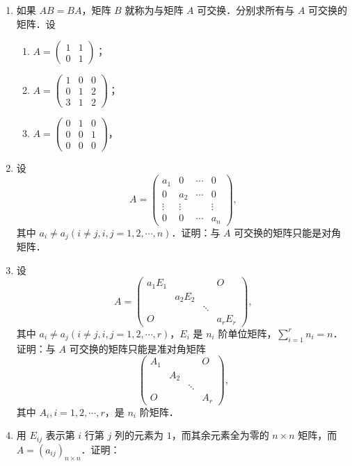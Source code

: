 \begin{enumerate}
\begin{enumerate}
  \anssub
  \end{enumerate}
  \item 如果 $AB=BA$，矩阵 $B$ 就称为与矩阵 $A$ 可交换．分别求所有与 $A$ 可交换的矩阵．设
  \begin{enumerate}
    \item $A=\begin{pmatrix}1&1\\0&1\end{pmatrix}$；
  \anssub
    \item $A=\begin{pmatrix}1&0&0\\0&1&2\\3&1&2\end{pmatrix}$；
  \anssub
    \item $A=\begin{pmatrix}0&1&0\\0&0&1\\0&0&0\end{pmatrix}$，
  \anssub
  \end{enumerate}
  \item 设
  \[
    A=\begin{pmatrix}
      a_1&0&\cdots&0\\
      0&a_2&\cdots&0\\
      \vdots&\vdots&&\vdots\\
      0&0&\cdots&a_n
    \end{pmatrix},
  \]
  其中 $a_i\neq a_j(i\neq j,i,j=1,2,\cdots,n)$．证明：与 $A$ 可交换的矩阵只能是对角矩阵．
  \ansproof
  \item 设
  \[
    A=\begin{pmatrix}
      a_1E_1&&&O\\
      &a_2E_2&&\\
      &&\ddots&\\
      O&&&a_rE_r
    \end{pmatrix},
  \]
  其中 $a_i\neq a_j(i\neq j,i,j=1,2,\cdots,r)$，$E_i$ 是 $n_i$ 阶单位矩阵，$\sum\limits_{i=1}^{r}n_i=n$．证明：与 $A$ 可交换的矩阵只能是准对角矩阵
  \[
    \begin{pmatrix}
      A_1&&&O\\
      &A_2&&\\
      &&\ddots&\\
      O&&&A_r
    \end{pmatrix},
  \]
  其中 $A_i,i=1,2,\cdots,r$，是 $n_i$ 阶矩阵．
  \ansproof
  \item 用 $E_{ij}$ 表示第 $i$ 行第 $j$ 列的元素为 $1$，而其余元素全为零的 $n\times n$ 矩阵，而 $A=(a_{ij})_{n\times n}$．证明：

\end{enumerate}
